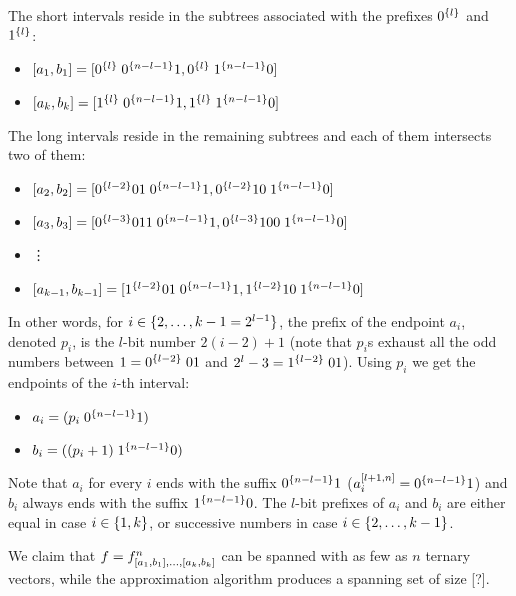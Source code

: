The short intervals reside in the subtrees associated
with the prefixes $0^{\{l\}}$ and $1^{\{l\}}$:

\begin{itemize}
\item
$[a_1, b_1] =
[0^{\{l\}} \; 0^{\{n-l-1\}} 1, 0^{\{l\}} \; 1^{\{n-l-1\}} 0]$
\item
$[a_k, b_k] =
[1^{\{l\}} \; 0^{\{n-l-1\}} 1, 1^{\{l\}} \; 1^{\{n-l-1\}} 0]$
\end{itemize}

The long intervals reside in the remaining subtrees
and each of them intersects two of them:

\begin{itemize}
\item
$[a_2, b_2] =
[0^{\{l-2\}} 01 \; 0^{\{n-l-1\}} 1, 0^{\{l-2\}} 10 \; 1^{\{n-l-1\}} 0]$
\item
$[a_3, b_3] =
[0^{\{l-3\}} 011 \; 0^{\{n-l-1\}} 1, 0^{\{l-3\}} 100 \; 1^{\{n-l-1\}} 0]$
\item \vdots
{}
\item
$[a_{k-1}, b_{k-1}] =
[1^{\{l-2\}} 01 \; 0^{\{n-l-1\}} 1, 1^{\{l-2\}} 10 \; 1^{\{n-l-1\}} 0]$
\end{itemize}

In other words,
for $i \in \{2, \ldots, k-1 = 2^{l-1}\}$,
the prefix of the endpoint $a_i$,
denoted $p_i$,
is the $l$-bit number $2 (i-2) + 1$
(note that $p_i$s exhaust all the odd numbers
between $1 = 0^{\{l-2\}} \; 01$
and $2^l - 3 = 1^{\{l-2\}} \; 01$).
Using $p_i$ we get the endpoints of the $i$-th interval:

\begin{itemize}
\item $a_i = (p_i \; 0^{\{n-l-1\}} 1)$
\item $b_i = ((p_i + 1) \; 1^{\{n-l-1\}} 0)$
\end{itemize}

Note that $a_i$ for every $i$
ends with the suffix $0^{\{n-l-1\}} 1$
($a_i^{[l+1, n]} = 0^{\{n-l-1\}} 1$)
and $b_i$ always ends with the suffix $1^{\{n-l-1\}} 0$.
The $l$-bit prefixes of $a_i$ and $b_i$
are either equal
in case $i \in \{1, k\}$,
or successive numbers in case
$i \in \{2, \ldots, k-1\}$.

We claim that $f =
f^n_{[a_1, b_1], \ldots, [a_k, b_k]}$
can be spanned with as few as $n$
ternary vectors,
while the approximation algorithm produces a spanning set
of size [?].


